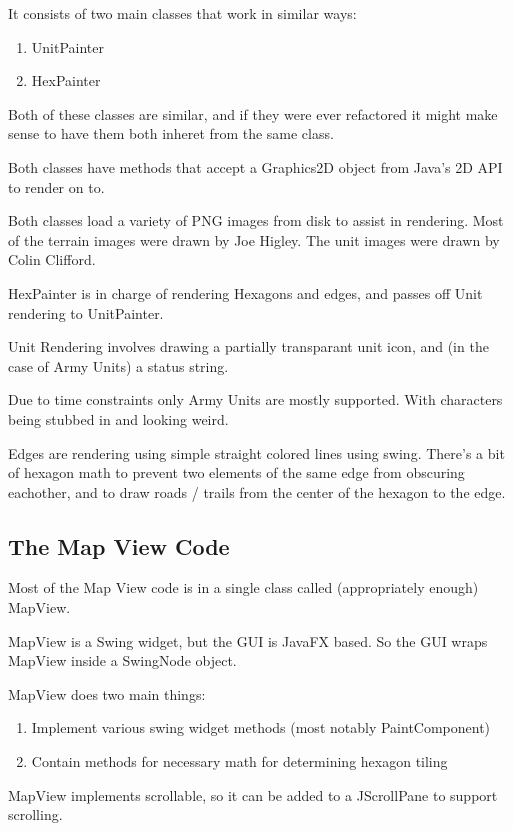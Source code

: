 \documentclass[12pt,a4paper]{article}
\begin{document}
It consists of two main classes that work in similar ways:
\begin{enumerate}
\item{UnitPainter}
\item{HexPainter}
\end{enumerate}

Both of these classes are similar, and if they were ever refactored it might
make sense to have them both inheret from the same class.

Both classes have methods that accept a Graphics2D object from Java's 2D API
to render on to.

Both classes load a variety of PNG images from disk to assist in rendering.
Most of the terrain images were drawn by Joe Higley.
The unit images were drawn by Colin Clifford.

HexPainter is in charge of rendering Hexagons and edges,
and passes off Unit rendering to UnitPainter.

Unit Rendering involves drawing a partially transparant unit icon,
and (in the case of Army Units) a status string.

Due to time constraints only Army Units are mostly supported. With characters
being stubbed in and looking weird.

Edges are rendering using simple straight colored lines using swing.
There's a bit of hexagon math to prevent two elements of the same edge
from obscuring eachother, and to draw roads / trails from the center of the
hexagon to the edge.


\subsection{The Map View Code}
Most of the Map View code is in a single class called (appropriately enough)
MapView.

MapView is a Swing widget, but the GUI is JavaFX based. So the GUI wraps
MapView inside a SwingNode object.

MapView does two main things:
\begin{enumerate}
\item{Implement various swing widget methods (most notably PaintComponent)}
\item{Contain methods for necessary math for determining hexagon tiling}
\end{enumerate}

MapView implements scrollable, so it can be added to a JScrollPane to support
scrolling.
\end{document}
